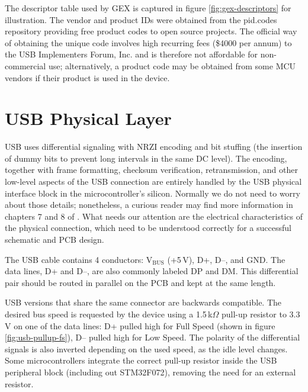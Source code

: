 The descriptor table used by GEX is captured in figure \ref{fig:gex-descriptors} for illustration. The vendor and product IDs were obtained from the pid.codes repository \cite{pidcodes} providing free product codes to open source projects. The official way of obtaining the unique code involves high recurring fees (\$4000 per annum) to the USB Implementers Forum, Inc. and is therefore not affordable for non-commercial use; alternatively, a product code may be obtained from some \gls{MCU} vendors if their product is used in the device.
\newpage



\section{USB Physical Layer}

\gls{USB} uses differential signaling with \gls{NRZI} encoding and bit stuffing (the insertion of dummy bits to prevent long intervals in the same \gls{DC} level). The encoding, together with frame formatting, checksum verification, retransmission, and other low-level aspects of the \gls{USB} connection are entirely handled by the \gls{USB} physical interface block in the microcontroller's silicon. Normally we do not need to worry about those details; nonetheless, a curious reader may find more information in chapters 7 and 8 of \cite{usbif-spec}. What needs our attention are the electrical characteristics of the physical connection, which need to be understood correctly for a successful schematic and \gls{PCB} design.

The \gls{USB} cable contains 4 conductors: V$_\mathrm{BUS}$ (+5\,V), D+, D--, and \gls{GND}. The data lines, D+ and D--, are also commonly labeled DP and DM. This differential pair should be routed in parallel on the \gls{PCB} and kept at the same length.

\gls{USB} versions that share the same connector are backwards compatible. The desired bus speed is requested by the device using a 1.5\,k$\Omega$ pull-up resistor to 3.3\,V on one of the data lines: D+ pulled high for Full Speed (shown in figure \ref{fig:usb-pullup-fs}), D-- pulled high for Low Speed. The polarity of the differential signals is also inverted depending on the used speed, as the idle level changes. Some microcontrollers integrate the correct pull-up resistor inside the \gls{USB} peripheral block (including out STM32F072), removing the need for an external resistor.

